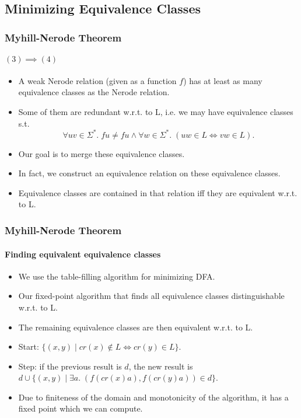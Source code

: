 \documentclass{beamer}
\begin{document}
\subsection{Minimizing Equivalence Classes}
\begin{frame}
    \frametitle{Myhill-Nerode Theorem}
    \framesubtitle{$(3) \implies (4)$}
    \begin{itemize}
        \item A weak Nerode relation (given as a function $f$) has at least as many equivalence classes as the Nerode relation.
        \item Some of them are redundant w.r.t. to L, i.e. we may have equivalence classes s.t.
            \begin{equation*}
                \forall u v \in \Sigma^*. \; f u \neq f u \wedge \forall w \in \Sigma^*. \; (uw \in L \iff vw \in L).
            \end{equation*}
        \item Our goal is to merge these equivalence classes. 
        \item In fact, we construct an equivalence relation on these equivalence classes.
        \item Equivalence classes are contained in that relation iff they are equivalent w.r.t. to L.
    \end{itemize}
\end{frame}

\begin{frame}
    \frametitle{Myhill-Nerode Theorem}
    \framesubtitle{Finding equivalent equivalence classes}
    \begin{itemize}
        \item We use the table-filling algorithm for minimizing DFA. 
        \item Our fixed-point algorithm that finds all equivalence classes distinguishable w.r.t. to L.
        \item The remaining equivalence classes are then equivalent w.r.t. to L. 
        \item Start: $\{ (x,y) \; | \; cr(x) \notin L \iff cr(y) \in L \}$.
        \item Step: if the previous result is $d$, the new result is $d \cup \{ (x,y) \; | \; \exists a. \; (f(cr(x)a), f(cr(y)a)) \in d \}$.
        \item Due to finiteness of the domain and monotonicity of the algorithm, it has a fixed point which we can compute.
    \end{itemize}
\end{frame}
\end{document}
